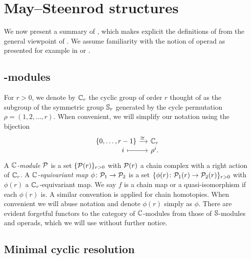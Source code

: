 
\section{May--Steenrod structures}

We now present a summary of \cite{medina2021may_st}, which makes explicit the definitions of \cite{steenrod1953cyclic} from the general viewpoint of \cite{may1970general}.
We assume familiarity with the notion of operad as presented for example in \cite{may1997operads} or \cite{loday2012operads}.

\subsection{\pdfC-modules}

For $r > 0$, we denote by $\mathbb{C}_r$ the cyclic group of order $r$ thought of as the subgroup of the symmetric group $\mathbb{S}_r$ generated by the cycle permutation $\rho = (1,2,\dots,r)$.
When convenient, we will simplify our notation using the bijection
\[
\begin{tikzcd}[column sep=small,row sep=-5]
	\{0,\dots,r-1\} \rar["\cong\ "] & \cyc_r \\
	\qquad i \rar[maps to] & \rho^i.
\end{tikzcd}
\]
A \textit{$\mathbb{C}$-module} $\mathcal{P}$ is a set $\{\mathcal{P}(r)\}_{r>0}$ with $\mathcal{P}(r)$ a chain complex with a right action of $\mathbb{C}_r$.
A \textit{$\mathbb{C}$-equivariant map} $\phi \colon \mathcal{P}_1 \to \mathcal{P}_2$ is a set $\{\phi(r) \colon \mathcal{P}_1(r) \to \mathcal{P}_2(r)\}_{r>0}$ with $\phi(r)$ a $\mathbb{C}_r$-equivariant map.
We say $f$ is a chain map or a quasi-isomorphism if each $\phi(r)$ is.
A similar convention is applied for chain homotopies.
When convenient we will abuse notation and denote $\phi(r)$ simply as $\phi$.
There are evident forgetful functors to the category of $\mathbb{C}$-modules from those of $\mathbb{S}$-modules and operads, which we will use without further notice.

\subsection{Minimal cyclic resolution}

